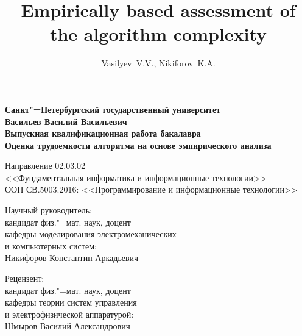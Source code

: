 \documentclass[a4paper, article, 14pt]{extarticle}
\begin{document}

\author{Vasilyev~V.\:V., Nikiforov~K.\:A.}
\title{Empirically based assessment of the algorithm complexity}




\begin{center}
	\textbf{Санкт"=Петербургский государственный университет}\\
	\hfill \break
	\hfill \break
	\textbf{Васильев Василий Васильевич}\\
	\hfill \break
	\hfill \break
	\textbf{Выпускная квалификационная работа бакалавра}\\
	\hfill \break
	\Large{\textbf{Оценка трудоемкости алгоритма на основе эмпирического анализа}}\\
\end{center}

\begin{center}
	Направление 02.03.02\\
	<<Фундаментальная информатика и информационные технологии>>\\
	ООП СВ.5003.2016: <<Программирование и информационные технологии>>\\
\end{center}

\hfill \break

\begin{flushright}
	Научный руководитель:\\
	кандидат физ."=мат. наук, доцент\\
	кафедры моделирования электромеханических\\
	и компьютерных систем:\\
	Никифоров Константин Аркадьевич
\end{flushright}

\begin{flushright}
	Рецензент:\\
	кандидат физ."=мат. наук, доцент\\
	кафедры теории систем управления\\
	и электрофизической аппаратурой:\\
	Шмыров Василий Александрович
\end{flushright}

\hfill \break
\end{document}
